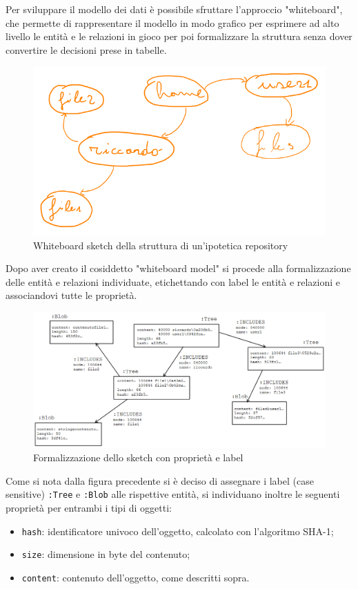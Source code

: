 Per sviluppare il modello dei dati è possibile sfruttare l'approccio "whiteboard", che permette di rappresentare il modello in modo grafico per esprimere ad alto livello le entità e le relazioni in gioco per poi formalizzare la struttura senza dover convertire le decisioni prese in tabelle.
\begin{figure}[H]
    \centering
    \includegraphics[width=15cm]{./immagini/whiteboard_sketch.png}
    \caption{Whiteboard sketch della struttura di un'ipotetica repository}
\end{figure}
Dopo aver creato il cosiddetto "whiteboard model" si procede alla formalizzazione delle entità e relazioni individuate, etichettando con label le entità e relazioni e associandovi tutte le proprietà.
\begin{figure}[H]
    \centering
    \includegraphics[width=15cm]{./immagini/whiteboard_formal.png}
    \caption{Formalizzazione dello sketch con proprietà e label}
\end{figure}
Come si nota dalla figura precedente si è deciso di assegnare i label (case sensitive) \texttt{:Tree} e \texttt{:Blob} alle rispettive entità, si individuano inoltre le seguenti proprietà per entrambi i tipi di oggetti:
\begin{itemize}
    \item \texttt{hash}: identificatore univoco dell'oggetto, calcolato con l'algoritmo SHA-1;
    \item \texttt{size}: dimensione in byte del contenuto;
    \item \texttt{content}: contenuto dell'oggetto, come descritti sopra.
\end{itemize}

